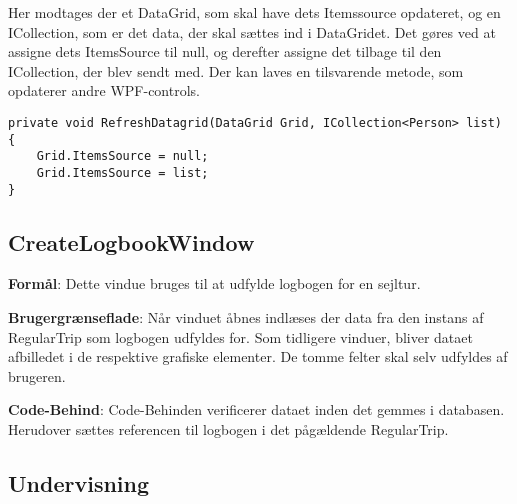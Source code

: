 Her modtages der et DataGrid, som skal have dets Itemssource opdateret, og en ICollection, som er det data, der skal sættes ind i DataGridet. 
Det gøres ved at assigne dets ItemsSource til null, og derefter assigne det tilbage til den ICollection, der blev sendt med. 
Der kan laves en tilsvarende metode, som opdaterer andre WPF-controls.

\begin{lstlisting}[frame=single, caption=Refresh Datagrid, label=RefreshDatagrid]
private void RefreshDatagrid(DataGrid Grid, ICollection<Person> list)
{
    Grid.ItemsSource = null;
    Grid.ItemsSource = list;
}
\end{lstlisting}

\subsection{CreateLogbookWindow}

\textbf{Formål}: 
Dette vindue bruges til at udfylde logbogen for en sejltur.

\textbf{Brugergrænseflade}:  
Når vinduet åbnes indlæses der data fra den instans af RegularTrip som logbogen udfyldes for.
Som tidligere vinduer, bliver dataet afbilledet i de respektive grafiske elementer. 
De tomme felter skal selv udfyldes af brugeren. 

\textbf{Code-Behind}: 
Code-Behinden verificerer dataet inden det gemmes i databasen.
Herudover sættes referencen til logbogen i det pågældende RegularTrip.

\subsection{Undervisning}
